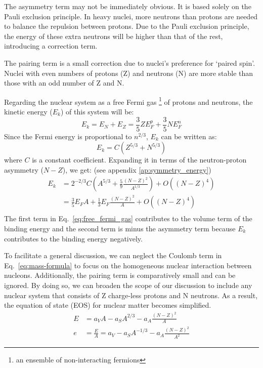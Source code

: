 The asymmetry term may not be immediately obvious. 
It is based solely on the Pauli exclusion principle. 
In heavy nuclei, more neutrons than protons are needed to balance the repulsion between protons.
Due to the Pauli exclusion principle, the energy of these extra neutrons will be 
higher than that of the rest, introducing a correction term.

The pairing term is a small correction due to nuclei's preference for `paired spin'. %
Nuclei with even numbers of protons (Z) and neutrons (N) are more stable than 
those with an odd number of Z and N.

Regarding the nuclear system as a free Fermi gas \footnote{an ensemble of non-interacting fermions} 
of protons and neutrons, the kinetic energy ($E_k$) of this system will be:
\begin{equation}
    E_k = E_N + E_Z = \frac{3}{5}ZE_F^p + \frac{3}{5}NE_F^n
\end{equation}
Since the Fermi energy is proportional to $n^{2/3}$, $E_k$ can be written as:
\begin{equation}
    E_k = C(Z^{5/3} + N^{5/3})
\end{equation}
where $C$ is a constant coefficient. 
Expanding it in terms of the neutron-proton asymmetry ($N-Z$), we get: 
(see appendix \ref{ap:symmetry_energy})
\begin{equation}
    \begin{aligned}
	E_k &= 2^{-2/3}C\left(A^{5/3} + \frac{5}{9}\frac{(N-Z)^2}{A^{1/3}} \right) + O((N-Z)^4) \\
	    &= \frac{3}{5} E_F A + \frac{1}{3}E_F\frac{(N-Z)^2}{A} + O((N-Z)^4) \\
    \end{aligned}
    \label{eq:free_fermi_gas}
\end{equation}
The first term in Eq.~\ref{eq:free_fermi_gas} contributes to the volume term 
of the binding energy and the second term is minus the 
asymmetry term because $E_k$ contributes to the binding energy negatively.

To facilitate a general discussion, we can neglect the Coulomb term in Eq.~\ref{eq:mass-formula}
to focus on the homogeneous nuclear interaction between nucleons.
Additionally, the pairing term is comparatively small and can be ignored.
By doing so, we can broaden the scope of our discussion to include any nuclear
system that consists of Z charge-less protons and N neutrons. As a result, 
the equation of state (EOS) for nuclear matter becomes simplified.
\begin{equation}
    \begin{aligned}
	E &= a_V A - a_S A^{2/3} - a_A\frac{(N-Z)^2}{A}  \\
	e &= \frac{E}{A} = a_V - a_S A^{-1/3} - a_A\frac{(N-Z)^2}{A^2}
    \end{aligned}
    \label{eq:modified-mass-formula-1}
\end{equation}

